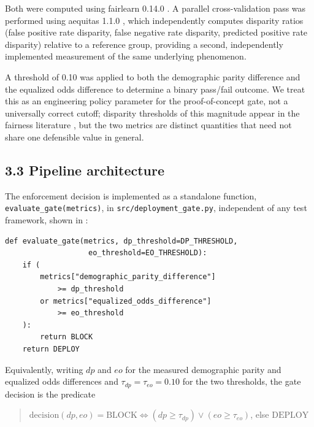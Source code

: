 \documentclass[]{einformatica}
\newenvironment{code}{\captionsetup{type=listing}}{}
\begin{document}
Both were computed using fairlearn 0.14.0 \cite{Bird2020}. A parallel cross-validation pass was performed using aequitas 1.1.0 \cite{Saleiro2018}, which independently computes disparity ratios (false positive rate disparity, false negative rate disparity, predicted positive rate disparity) relative to a reference group, providing a second, independently implemented measurement of the same underlying phenomenon.

A threshold of 0.10 was applied to both the demographic parity difference and the equalized odds difference to determine a binary pass/fail outcome. We treat this as an engineering policy parameter for the proof-of-concept gate, not a universally correct cutoff; disparity thresholds of this magnitude appear in the fairness literature \cite{Feldman2015}, but the two metrics are distinct quantities that need not share one defensible value in general.

\subsection*{3.3 Pipeline architecture}\label{sec:Method-Pipeline}

The enforcement decision is implemented as a standalone function, \texttt{evaluate\_gate(metrics)}, in \texttt{src/deployment\_gate.py}, independent of any test framework, shown in :

\begin{code}
\caption{The gate's decision function, \texttt{evaluate\_gate()}}
\label{listing:gate}
\begin{verbatim}
def evaluate_gate(metrics, dp_threshold=DP_THRESHOLD,
                   eo_threshold=EO_THRESHOLD):
    if (
        metrics["demographic_parity_difference"]
            >= dp_threshold
        or metrics["equalized_odds_difference"]
            >= eo_threshold
    ):
        return BLOCK
    return DEPLOY
\end{verbatim}
\end{code}

Equivalently, writing $dp$ and $eo$ for the measured demographic parity and equalized odds differences and $\tau_{dp} = \tau_{eo} = 0.10$ for the two thresholds, the gate decision is the predicate

\begin{quote}
$\mathrm{decision}(dp, eo) = \mathrm{BLOCK} \iff (dp \geq \tau_{dp}) \lor (eo \geq \tau_{eo})$, else $\mathrm{DEPLOY}$
\end{quote}
\end{document}
